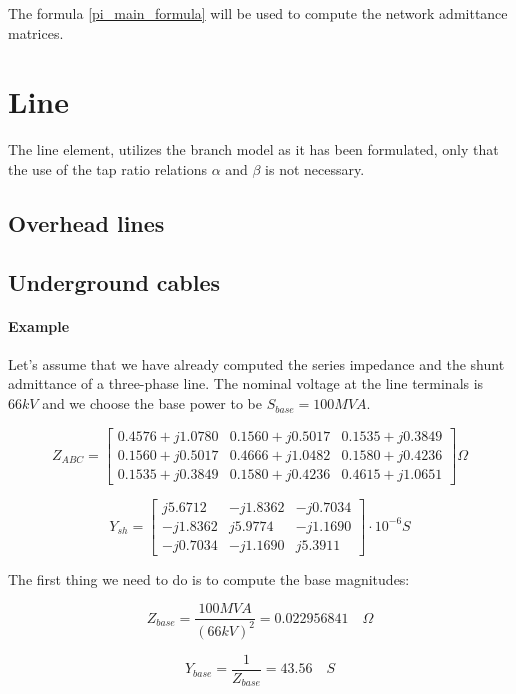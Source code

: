 \documentclass[a4paper,twoside,fleqn]{tufte-book}
\begin{document}
The formula \ref{pi_main_formula} will be used to compute the network admittance matrices.


\section{Line}

The line element, utilizes the branch model as it has been formulated, only that the use of the tap ratio relations $\alpha$ and $\beta$ is not necessary.


\subsection{Overhead lines}


\subsection{Underground cables}


\paragraph{Example}

Let's assume that we have already computed the series impedance and the shunt admittance of a three-phase line. The nominal voltage at the line terminals is $66kV$ and we choose the base power to be $S_{base}=100MVA$.

$$
Z_{ABC} = \left[ \begin{array}{ccc}
0.4576 + j 1.0780 & 0.1560 + j0 .5017 & 0.1535 + j 0.3849 \\
0.1560 + j 0.5017 & 0.4666 + j 1.0482 & 0.1580 + j 0.4236 \\ 
0.1535 + j 0.3849 & 0.1580 + j 0.4236 & 0.4615 + j 1.0651
\end{array} \right] \Omega
$$

$$
Y_{sh} = \left[ \begin{array}{ccc}
j5.6712 & -j1.8362 & -j0.7034 \\
-j1.8362 & j5.9774 & -j1.1690 \\ 
-j0.7034 & -j1.1690 & j5.3911
\end{array} \right] \cdot 10^{-6}  S
$$

The first thing we need to do is to compute the base magnitudes:

$$
Z_{base} = \frac{100 MVA}{(66kV)^2} = 0.022956841 \quad \Omega
$$

$$
Y_{base} = \frac{1}{Z_{base}} = 43.56 \quad S
$$
\end{document}
